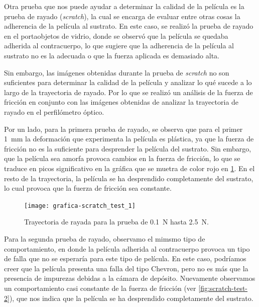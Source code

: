 \documentclass[12pt]{IEEEtran}
\begin{document}
%
Otra prueba que nos puede ayudar a determinar la calidad de la película es la prueba de rayado (\emph{scratch}), la cual se encarga de evaluar entre otras cosas la adherencia de la película al sustrato. En este caso, se realizó la prueba de rayado en el portaobjetos de vidrio, donde se observó que la película se quedaba adherida al contracuerpo, lo que sugiere que la adherencia de la película al sustrato no es la adecuada o que la fuerza aplicada es demasiado alta.

Sin embargo, las imágenes obtenidas durante la prueba de \emph{scratch} no son suficientes para determinar la calidad de la película y analizar lo qué sucede a lo largo de la trayectoria de rayado. Por lo que se realizó un análisis de la fuerza de fricción en conjunto con las imágenes obtenidas de analizar la trayectoria de rayado en el perfilómetro óptico.

Por un lado, para la primera prueba de rayado, se observa que para el primer \qty{1}{\mm} la deformación que experimenta la película es plástica, ya que la fuerza de fricción no es la suficiente para desprender la película del sustrato. Sin embargo, que la película sea amorfa provoca cambios en la fuerza de fricción, lo que se traduce en picos significativo en la gráfica que se muetra de color rojo en \cref{fig:scratch-test-1}. En el resto de la trayectoria, la película se ha desprendido completamente del sustrato, lo cual provoca que la fuerza de fricción sea constante.

\begin{figure}[htb]
	\centering
	\texttt{[image: grafica-scratch\_test\_1]}
	\caption{Trayectoria de rayada para la prueba de \qty{0.1}{\N} hasta \qty{2.5}{\N}.}
	\label{fig:scratch-test-1}
\end{figure}%

Para la segunda prueba de rayado, observamo el mimsmo tipo de comportamiento, en donde la película adherida al contracuerpo provoca un tipo de falla que no se esperaría para este tipo de película. En este caso, podríamos creer que la película presenta una falla del tipo Chevron, pero no es más que la presencia de impurezas debidas a la cámara de depósito. Nuevamente observamos un comportamiento casi constante de la fuerza de fricción (ver \cref{fig:scratch-test-2}), que nos indica que la película se ha desprendido completamente del sustrato.
\end{document}
